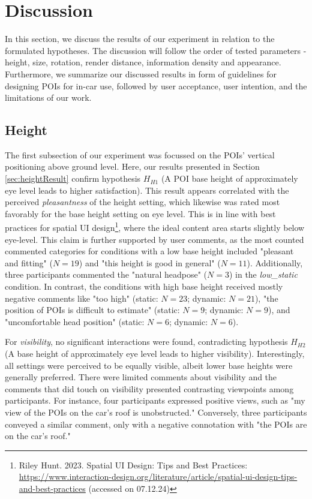 \section{Discussion}
\label{section:discussion}
In this section, we discuss the results of our experiment in relation to the formulated hypotheses. The discussion will follow the order of tested parameters - height, size, rotation, render distance, information density and appearance. Furthermore, we summarize our discussed results in form of guidelines for designing POIs for in-car use, followed by user acceptance, user intention, and the limitations of our work.



\subsection{Height}
The first subsection of our experiment was focussed on the POIs' vertical positioning above ground level. Here, our results presented in Section \ref{sec:heightResult} confirm hypothesis $H_{H1}$ (A POI base height of approximately eye level leads to higher satisfaction). This result appears correlated with the perceived \textit{pleasantness} of the height setting, which likewise was rated most favorably for the base height setting on eye level. This is in line with best practices for spatial UI design\footnote{Riley Hunt. 2023. Spatial UI Design: Tips and Best Practices: \url{https://www.interaction-design.org/literature/article/spatial-ui-design-tips-and-best-practices} (accessed on 07.12.24)}, where the ideal content area starts slightly below eye-level. This claim is further supported by user comments, as the most counted commented categories for conditions with a low base height included "pleasant and fitting" ($N=19$) and "this height is good in general" ($N=11$). Additionally, three participants commented the "natural headpose" ($N=3$) in the \textit{low\_static} condition. In contrast, the conditions with high base height received mostly negative comments like "too high" (static: $N=23$; dynamic: $N=21$), "the position of POIs is difficult to estimate" (static: $N=9$; dynamic: $N=9$), and "uncomfortable head position" (static: $N=6$; dynamic: $N=6$). 

For \textit{visibility}, no significant interactions were found, contradicting hypothesis $H_{H2}$ (A base height of approximately eye level leads to higher visibility). Interestingly, all settings were perceived to be equally visible, albeit lower base heights were generally preferred. There were limited comments about visibility and the comments that did touch on visibility presented contrasting viewpoints among participants. For instance, four participants expressed positive views, such as "my view of the POIs on the car's roof is unobstructed." Conversely, three participants conveyed a similar comment, only with a negative connotation with "the POIs are on the car's roof." 

